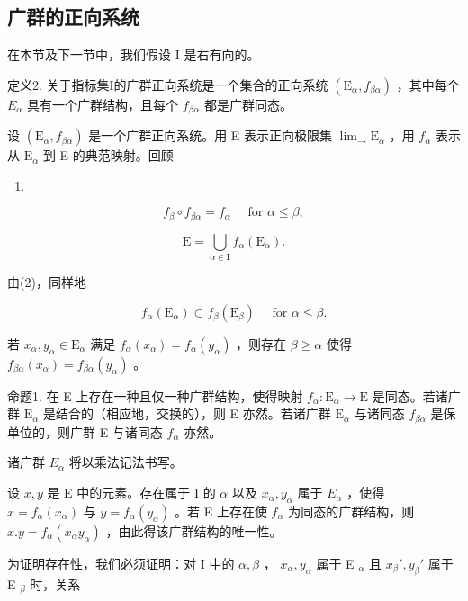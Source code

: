 \subsection{广群的正向系统}

在本节及下一节中，我们假设 I 是右有向的。

定义2. 关于指标集I的广群正向系统是一个集合的正向系统 \((\mathrm{E}_{\alpha}, f_{\beta\alpha})\) ，其中每个 \(E_{\alpha}\) 具有一个广群结构，且每个 \(f_{\beta\alpha}\) 都是广群同态。

设 \((\mathrm{E}_{\alpha}, f_{\beta\alpha})\) 是一个广群正向系统。用 E 表示正向极限集 \(\lim_{\rightarrow} \mathrm{E}_{\alpha}\) ，用 \(f_{\alpha}\) 表示从 \(\mathrm{E}_{\alpha}\) 到 E 的典范映射。回顾

\begin{enumerate}
\def\labelenumi{(\arabic{enumi})}
\setcounter{enumi}{1}
\tightlist
\item
\end{enumerate}

\[
f _ {\beta} \circ f _ {\beta \alpha} = f _ {\alpha} \quad \text { for } \alpha \leqslant \beta ,\tag{3}
\]

\[
\mathrm{E} = \bigcup_ {\alpha \in \mathbf {I}} f _ {\alpha} (\mathrm{E} _ {\alpha}).
\]

由(2)，同样地

\[
f _ {\alpha} (\mathrm{E} _ {\alpha}) \subset f _ {\beta} (\mathrm{E} _ {\beta}) \quad \text { for } \alpha \leqslant \beta .\tag{4}
\]

若 \(x_{\alpha}, y_{\alpha} \in \mathrm{E}_{\alpha}\) 满足 \(f_{\alpha}(x_{\alpha}) = f_{\alpha}(y_{\alpha})\) ，则存在 \(\beta \geqslant \alpha\) 使得 \(f_{\beta \alpha}(x_{\alpha}) = f_{\beta \alpha}(y_{\alpha})\) 。

命题1. 在 E 上存在一种且仅一种广群结构，使得映射 \(f_{\alpha} \colon \mathrm{E}_{\alpha} \to \mathrm{E}\) 是同态。若诸广群 \(\mathrm{E}_{\alpha}\) 是结合的（相应地，交换的），则 E 亦然。若诸广群 \(\mathrm{E}_{\alpha}\) 与诸同态 \(f_{\beta \alpha}\) 是保单位的，则广群 E 与诸同态 \(f_{\alpha}\) 亦然。

诸广群 \(E_{\alpha}\) 将以乘法记法书写。

设 \(x, y\) 是 E 中的元素。存在属于 I 的 \(\alpha\) 以及 \(x_{\alpha}, y_{\alpha}\) 属于 \(E_{\alpha}\) ，使得 \(x = f_{\alpha}(x_{\alpha})\) 与 \(y = f_{\alpha}(y_{\alpha})\) 。若 E 上存在使 \(f_{\alpha}\) 为同态的广群结构，则 \(x.y = f_{\alpha}(x_{\alpha}y_{\alpha})\) ，由此得该广群结构的唯一性。

为证明存在性，我们必须证明：对 I 中的 \(\alpha, \beta\) ， \(x_{\alpha}, y_{\alpha}\) 属于 E \(_{\alpha}\) 且 \(x_{\beta}', y_{\beta}'\) 属于 E \(_{\beta}\) 时，关系

